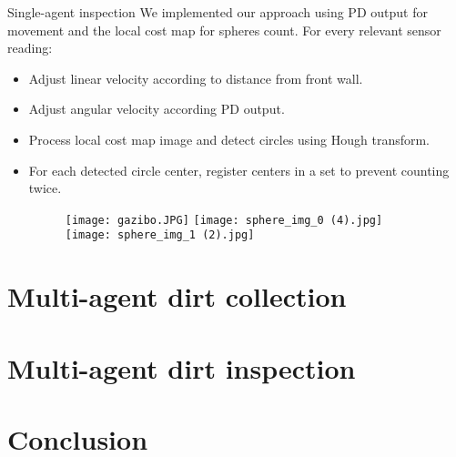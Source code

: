 \documentclass[10pt]{beamer}
\begin{document}
\begin{frame}{Single-agent inspection}
We implemented our approach using PD output for movement and the local cost map  for spheres count. For every relevant sensor reading:
\graphicspath{{images/}}
\begin{itemize}
    \item Adjust linear velocity according to distance from front wall.
    \item Adjust angular velocity according PD output.
    \item Process local cost map image and detect circles using Hough transform.
    \item For each detected circle center, register centers in a set to prevent counting twice.
    \bigskip
    
    \begin{figure}[htp]
    \texttt{[image: gazibo.JPG]}
    \texttt{[image: sphere\_img\_0 (4).jpg]}
    \texttt{[image: sphere\_img\_1 (2).jpg]}

    \label{fig:galaxy}
\end{figure}
    
\end{itemize}

\end{frame}


\section{Multi-agent dirt collection}

\section{Multi-agent dirt inspection}

\section{Conclusion}
\end{document}
